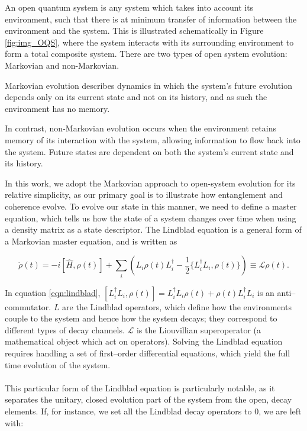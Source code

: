\documentclass[11pt]{article}
\begin{document}
\noindent An open quantum system is any system which takes into account its environment, such that there is at minimum transfer of information between the environment and the system. This is illustrated schematically in Figure \ref{fig:img_OQS}, where the system interacts with its surrounding environment to form a total composite system. There are two types of open system evolution: Markovian and non-Markovian.

Markovian evolution describes dynamics in which the system's future evolution depends only on its current state and not on its history, and as such the environment has no memory. 

In contrast, non-Markovian evolution occurs when the environment retains memory of its interaction with the system, allowing information to flow back into the system. Future states are dependent on both the system's current state and its history. 

In this work, we adopt the Markovian approach to open-system evolution for its relative simplicity, as our primary goal is to illustrate how entanglement and coherence evolve. To evolve our state in this manner, we need to define a master equation, which tells us how the state of a system changes over time when using a density matrix as a state descriptor. The Lindblad equation is a general form of a Markovian master equation, and is written as 

\begin{equation} \label{eqn:lindblad}
    \dot \rho(t) = - i[\hat{H}, \rho(t)] + \sum_i\left(L_i\rho(t)L_i^\dagger - \frac{1}{2}\{L_i^\dagger L_i,\rho(t)\} \right) \equiv \mathcal{L}\rho(t).
\end{equation} 

In equation \ref{eqn:lindblad}, $[L_i^\dagger L_i, \rho (t)] = L_i^\dagger L_i\rho(t) + \rho(t)L_i^\dagger L_i$ is an anti--commutator. $L$ are the Lindblad operators, which define how the environments couple to the system and hence how the system decays; they correspond to different types of decay channels. $\mathcal{L}$ is the Liouvillian superoperator (a mathematical object which act on operators). Solving the Lindblad equation requires handling a set of first--order differential equations, which yield the full time evolution of the system. \\
\\
This particular form of the Lindblad equation is particularly notable, as it separates the unitary, closed evolution part of the system from the open, decay elements. If, for instance, we set all the Lindblad decay operators to 0, we are left with:
\end{document}
